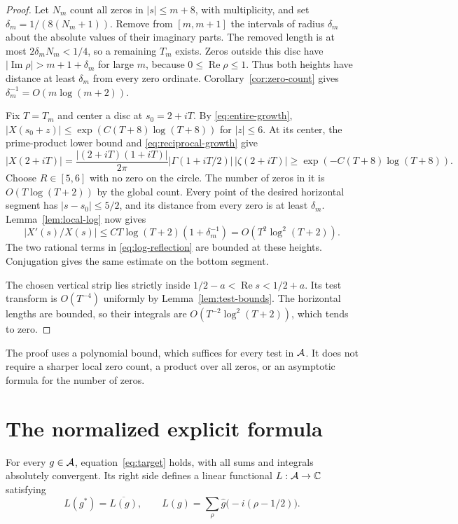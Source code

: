 \begin{proof}
Let $N_m$ count all zeros in $|s|\leq m+8$, with multiplicity, and set
$\delta_m=1/(8(N_m+1))$.
Remove from $[m,m+1]$ the intervals of radius $\delta_m$ about the absolute
values of their imaginary parts.
The removed length is at most $2\delta_mN_m<1/4$, so a remaining $T_m$ exists.
Zeros outside this disc have $|\operatorname{Im}\rho|>m+1+\delta_m$
for large $m$, because $0\leq\operatorname{Re}\rho\leq1$.
Thus both heights have distance at least $\delta_m$ from every zero ordinate.
Corollary~\ref{cor:zero-count} gives
$\delta_m^{-1}=O(m\log(m+2))$.

Fix $T=T_m$ and center a disc at $s_0=2+iT$.
By \eqref{eq:entire-growth},
$|X(s_0+z)|\leq\exp(C(T+8)\log(T+8))$ for $|z|\leq6$.
At its center, the prime-product lower bound and
\eqref{eq:reciprocal-growth} give
\[
 |X(2+iT)|
 =\frac{|(2+iT)(1+iT)|}{2\pi}
       |\Gamma(1+iT/2)|\,|\zeta(2+iT)|
 \geq\exp(-C(T+8)\log(T+8)).
\]
Choose $R\in[5,6]$ with no zero on the circle.
The number of zeros in it is $O(T\log(T+2))$ by the global count.
Every point of the desired horizontal segment has $|s-s_0|\leq5/2$,
and its distance from every zero is at least $\delta_m$.
Lemma~\ref{lem:local-log} now gives
\[
 |X'(s)/X(s)|
 \leq C T\log(T+2)(1+\delta_m^{-1})
 =O(T^2\log^2(T+2)).
\]
The two rational terms in \eqref{eq:log-reflection} are bounded at these
heights.  Conjugation gives the same estimate on the bottom segment.

The chosen vertical strip lies strictly inside
$1/2-a<\operatorname{Re}s<1/2+a$.
Its test transform is $O(T^{-4})$ uniformly by
Lemma~\ref{lem:test-bounds}.
The horizontal lengths are bounded, so their integrals are
$O(T^{-2}\log^2(T+2))$, which tends to zero.
\end{proof}

The proof uses a polynomial bound, which suffices for every test in $\mathcal A$.
It does not require a sharper local zero count, a product over all zeros,
or an asymptotic formula for the number of zeros.

\section{The normalized explicit formula}
\label{sec:formula}

\begin{theorem}
\label{thm:explicit}
For every $g\in\mathcal A$, equation~\eqref{eq:target} holds, with all sums and
integrals absolutely convergent.
Its right side defines a linear functional $L:\mathcal A\to\mathbb C$ satisfying
\begin{equation}
 L(g^*)=\overline{L(g)},\qquad
 L(g)=\sum_\rho\widehat g\bigl(-i(\rho-1/2)\bigr).
 \label{eq:functional}
\end{equation}
\end{theorem}

